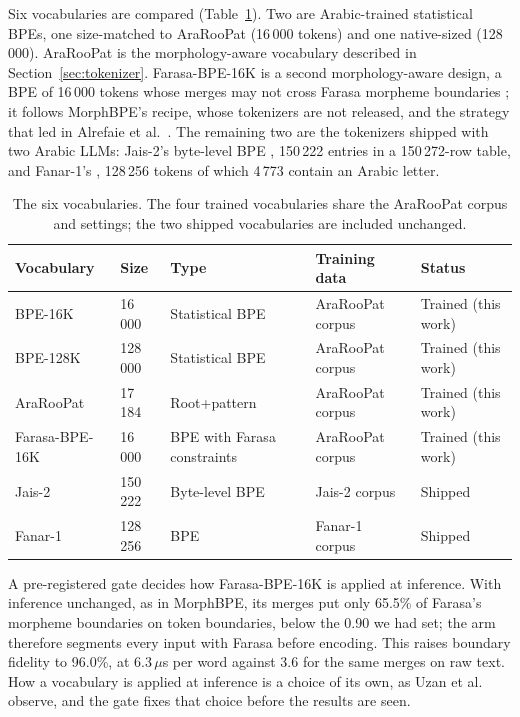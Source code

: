\documentclass[a4paper,fleqn]{cas-sc}
\begin{document}
Six vocabularies are compared (Table~\ref{tab:vocab}). Two are Arabic-trained statistical BPEs, one size-matched to AraRooPat (16\,000 tokens) and one native-sized (128\,000). AraRooPat is the morphology-aware vocabulary described in Section~\ref{sec:tokenizer}. Farasa-BPE-16K is a second morphology-aware design, a BPE of 16\,000 tokens whose merges may not cross Farasa morpheme boundaries \citep{abdelali2016farasa}; it follows MorphBPE's recipe, whose tokenizers are not released, and the strategy that led in Alrefaie et al.\ \citep{alrefaie2024exploring}. The remaining two are the tokenizers shipped with two Arabic LLMs: Jais-2's byte-level BPE \citep{anwar2026jais2}, 150\,222 entries in a 150\,272-row table, and Fanar-1's \citep{fanar2025}, 128\,256 tokens of which 4\,773 contain an Arabic letter.

\begin{table}[t]
\centering
\caption{The six vocabularies. The four trained vocabularies share the AraRooPat corpus and settings; the two shipped vocabularies are included unchanged.}
\label{tab:vocab}
\begin{tabular}{@{}lllll@{}}
\toprule
Vocabulary & Size & Type & Training data & Status \\
\midrule
BPE-16K & 16\,000 & Statistical BPE & AraRooPat corpus & Trained (this work) \\
BPE-128K & 128\,000 & Statistical BPE & AraRooPat corpus & Trained (this work) \\
AraRooPat & 17\,184 & Root+pattern & AraRooPat corpus & Trained (this work) \\
Farasa-BPE-16K & 16\,000 & BPE with Farasa constraints & AraRooPat corpus & Trained (this work) \\
Jais-2 & 150\,222 & Byte-level BPE & Jais-2 corpus & Shipped \\
Fanar-1 & 128\,256 & BPE & Fanar-1 corpus & Shipped \\
\bottomrule
\end{tabular}
\end{table}

A pre-registered gate decides how Farasa-BPE-16K is applied at inference. With inference unchanged, as in MorphBPE, its merges put only 65.5\% of Farasa's morpheme boundaries on token boundaries, below the 0.90 we had set; the arm therefore segments every input with Farasa before encoding. This raises boundary fidelity to 96.0\%, at 6.3\,$\mu$s per word against 3.6 for the same merges on raw text. How a vocabulary is applied at inference is a choice of its own, as Uzan et al.\ \citep{uzan2024greed} observe, and the gate fixes that choice before the results are seen.
\end{document}
